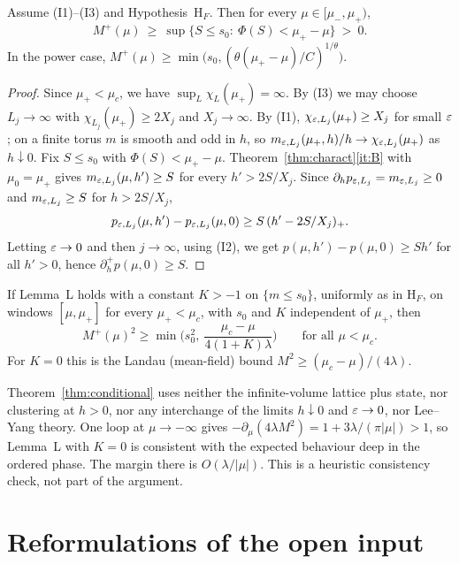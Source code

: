 \begin{theorem}\label{thm:conditional}
Assume (I1)--(I3) and Hypothesis~$\mathrm H_F$. Then for every $\mu\in[\mu_-,\mu_+)$,
\[
M^+(\mu)\ \ge\ \sup\{S\le s_0:\ \Phi(S)<\mu_+-\mu\}\ >\ 0 .
\]
In the power case, $M^+(\mu)\ge\min\big(s_0,(\theta(\mu_+-\mu)/C)^{1/\theta}\big)$.
\end{theorem}

\begin{proof}
Since $\mu_+<\mu_c$, we have $\sup_L\chi_L(\mu_+)=\infty$. By (I3) we may choose $L_j\to\infty$ with $\chi_{L_j}(\mu_+)\ge2X_j$ and $X_j\to\infty$. By (I1), $\chi_{\varepsilon,L_j}(\mu_+)\ge X_j$ for small $\varepsilon$; on a finite torus $m$ is smooth and odd in $h$, so $m_{\varepsilon,L_j}(\mu_+,h)/h\to\chi_{\varepsilon,L_j}(\mu_+)$ as $h\downarrow0$. Fix $S\le s_0$ with $\Phi(S)<\mu_+-\mu$. Theorem~\ref{thm:charact}\ref{it:B} with $\mu_0=\mu_+$ gives $m_{\varepsilon,L_j}(\mu,h')\ge S$ for every $h'>2S/X_j$. Since $\partial_hp_{\varepsilon,L_j}=m_{\varepsilon,L_j}\ge0$ and $m_{\varepsilon,L_j}\ge S$ for $h>2S/X_j$,
\[
p_{\varepsilon,L_j}(\mu,h')-p_{\varepsilon,L_j}(\mu,0)\ge S\,(h'-2S/X_j)_+ .
\]
Letting $\varepsilon\to0$ and then $j\to\infty$, using (I2), we get $p(\mu,h')-p(\mu,0)\ge Sh'$ for all $h'>0$, hence $\partial_h^+p(\mu,0)\ge S$.
\end{proof}

\begin{corollary}\label{cor:landau}
If Lemma~L holds with a constant $K>-1$ on $\{m\le s_0\}$, uniformly as in $\mathrm H_F$, on windows $[\mu,\mu_+]$ for every $\mu_+<\mu_c$, with $s_0$ and $K$ independent of $\mu_+$, then
\[
M^+(\mu)^2\ge\min\Big(s_0^2,\ \frac{\mu_c-\mu}{4(1+K)\lambda}\Big)\qquad\text{for all }\mu<\mu_c .
\]
For $K=0$ this is the Landau (mean-field) bound $M^2\ge(\mu_c-\mu)/(4\lambda)$.
\end{corollary}

\begin{remark}
Theorem~\ref{thm:conditional} uses neither the infinite-volume lattice plus state, nor clustering at $h>0$, nor any interchange of the limits $h\downarrow0$ and $\varepsilon\to0$, nor Lee--Yang theory. One loop at $\mu\to-\infty$ gives $-\partial_\mu(4\lambda M^2)=1+3\lambda/(\pi|\mu|)>1$, so Lemma~L with $K=0$ is consistent with the expected behaviour deep in the ordered phase. The margin there is $O(\lambda/|\mu|)$. This is a heuristic consistency check, not part of the argument.
\end{remark}

\section{Reformulations of the open input}\label{sec:reductions}

